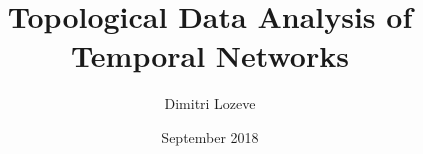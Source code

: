 
\setsecheadstyle{\Large\scshape}
\setsubsecheadstyle{\large\scshape}

\abstractintoc%
\renewcommand{\abstractnamefont}{\normalfont\large\scshape}
\renewcommand{\abstracttextfont}{\normalfont\normalsize}

\setlength{\epigraphwidth}{0.5\textwidth}


\author{Dimitri Lozeve}
\date{September 2018}
\title{Topological Data Analysis of Temporal Networks}







